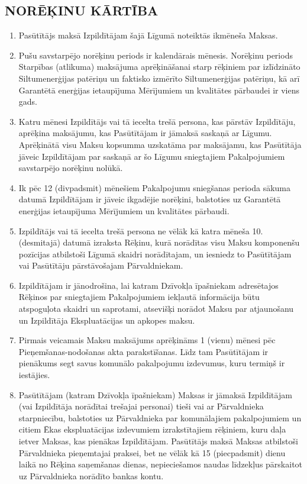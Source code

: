 \begin{multicols}{2}
\subsection{NORĒĶINU KĀRTĪBA}
\begin{enumerate}
	\item Pasūtītājs maksā Izpildītājam šajā Līgumā noteiktās ikmēneša Maksas.
	\item Pušu savstarpējo norēķinu periods ir kalendārais mēnesis. Norēķinu periods Starpības (atlikuma) maksājuma aprēķināšanai starp rēķiniem par izlīdzināto Siltumenerģijas patēriņu un faktisko izmērīto Siltumenerģijas patēriņu, kā arī Garantētā enerģijas ietaupījuma Mērījumiem un kvalitātes pārbaudei ir viens gads.
	\item Katru mēnesi Izpildītājs vai tā iecelta trešā persona, kas pārstāv Izpildītāju, aprēķina maksājumu, kas Pasūtītājam ir jāmaksā saskaņā ar Līgumu. Aprēķinātā visu Maksu kopsumma uzskatāma par maksājamu, kas Pasūtītāja jāveic Izpildītājam par saskaņā ar šo Līgumu sniegtajiem Pakalpojumiem savstarpējo norēķinu nolūkā.
	\item Ik pēc 12 (divpadsmit) mēnešiem Pakalpojumu sniegšanas perioda sākuma datumā Izpildītājam ir jāveic ikgadējie norēķini, balstoties uz Garantētā enerģijas ietaupījuma Mērījumiem un kvalitātes pārbaudi.
	\item Izpildītājs vai tā iecelta trešā persona ne vēlāk kā katra mēneša 10.  (desmitajā) datumā izraksta Rēķinu, kurā norādītas visu Maksu komponenšu pozīcijas atbilstoši Līgumā skaidri norādītajam, un iesniedz to Pasūtītājam vai Pasūtītāju pārstāvošajam Pārvaldniekam.
	\item Izpildītājam ir jānodrošina, lai katram Dzīvokļa īpašniekam adresētajos Rēķinos par sniegtajiem Pakalpojumiem iekļautā informācija būtu atspoguļota skaidri un saprotami, atsevišķi norādot Maksu par atjaunošanu un Izpildītāja Ekspluatācijas un apkopes maksu.
	\item Pirmais veicamais Maksu maksājums aprēķināms 1 (vienu) mēnesi pēc Pieņemšanas-nodošanas akta parakstīšanas. Līdz tam Pasūtītājam ir pienākums segt savus komunālo pakalpojumu izdevumus, kuru termiņš ir iestājies.
	\item Pasūtītājam (katram Dzīvokļa īpašniekam) Maksas ir jāmaksā Izpildītājam (vai Izpildītāja norādītai trešajai personai) tieši vai ar Pārvaldnieka starpniecību, balstoties uz Pārvaldnieka par komunālajiem pakalpojumiem un citiem Ēkas ekspluatācijas izdevumiem izrakstītajiem rēķiniem, kuru daļa ietver Maksas, kas pienākas Izpildītājam. Pasūtītājs maksā Maksas atbilstoši Pārvaldnieka pieņemtajai praksei, bet ne vēlāk kā 15 (piecpadsmit) dienu laikā no Rēķina saņemšanas dienas, nepieciešamos naudas līdzekļus pārskaitot uz Pārvaldnieka norādīto bankas kontu.

\end{enumerate}
\end{multicols}
